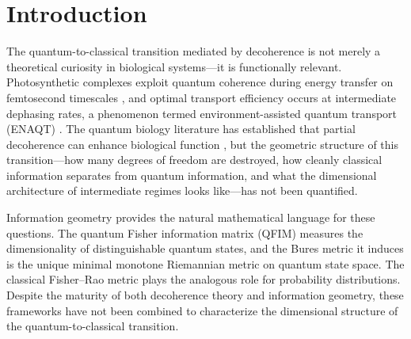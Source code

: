 \documentclass[12pt,a4paper]{article}
\theoremstyle{definition}
\theoremstyle{remark}
\begin{document}
\section{Introduction}
\label{sec:intro}

The quantum-to-classical transition mediated by decoherence \cite{zeh1970interpretation,zurek1981pointer,zurek2003decoherence,schlosshauer2005decoherence} is not merely a theoretical curiosity in biological systems---it is functionally relevant. Photosynthetic complexes exploit quantum coherence during energy transfer on femtosecond timescales \cite{engel2007evidence}, and optimal transport efficiency occurs at intermediate dephasing rates, a phenomenon termed environment-assisted quantum transport (ENAQT) \cite{plenio2008dephasing,rebentrost2009environment,mohseni2008environment}. The quantum biology literature has established that partial decoherence can enhance biological function \cite{cao2020quantum}, but the geometric structure of this transition---how many degrees of freedom are destroyed, how cleanly classical information separates from quantum information, and what the dimensional architecture of intermediate regimes looks like---has not been quantified.

Information geometry provides the natural mathematical language for these questions. The quantum Fisher information matrix (QFIM) \cite{liu2020quantum,braunstein1994statistical} measures the dimensionality of distinguishable quantum states, and the Bures metric it induces \cite{bures1969extension,uhlmann1976transition,petz1996monotone} is the unique minimal monotone Riemannian metric on quantum state space. The classical Fisher--Rao metric \cite{rao1945information,chentsov1982statistical,amari1985differential} plays the analogous role for probability distributions. Despite the maturity of both decoherence theory and information geometry, these frameworks have not been combined to characterize the dimensional structure of the quantum-to-classical transition.
\end{document}
